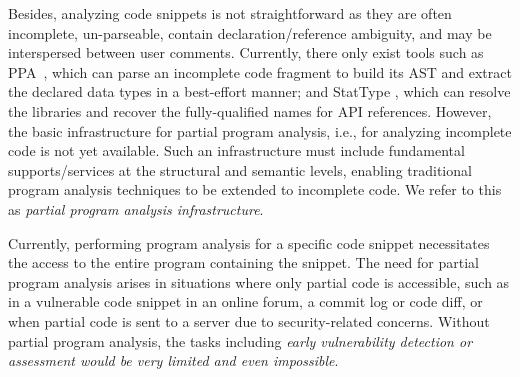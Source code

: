 Besides, analyzing code snippets is not straightforward as they are
often incomplete, un-parseable, contain declaration/reference
ambiguity, and may be interspersed between user comments. Currently,
there only exist tools such as PPA~\cite{ppa08}, which can parse an
incomplete code fragment to build its AST and extract the declared
data types in a best-effort manner; and StatType \cite{icse18}, which
can resolve the libraries and recover the fully-qualified names for
API references. However, the basic infrastructure for partial program
analysis, i.e., for analyzing incomplete code is not yet
available. Such an infrastructure must include fundamental
supports/services at the structural and semantic levels, enabling
traditional program analysis techniques to be extended to incomplete
code. We refer to this as \textit{partial program analysis
infrastructure}.


Currently, performing program analysis for a specific code snippet
necessitates the access to the entire program containing the
snippet. The need for partial program analysis arises in situations
where only partial code is accessible, such as in a vulnerable code
snippet in an online forum, a commit log or code diff, or when partial
code is sent to a server due to security-related concerns. Without
partial program analysis, the tasks including {\em early vulnerability
detection or assessment would be very limited and even impossible}.

